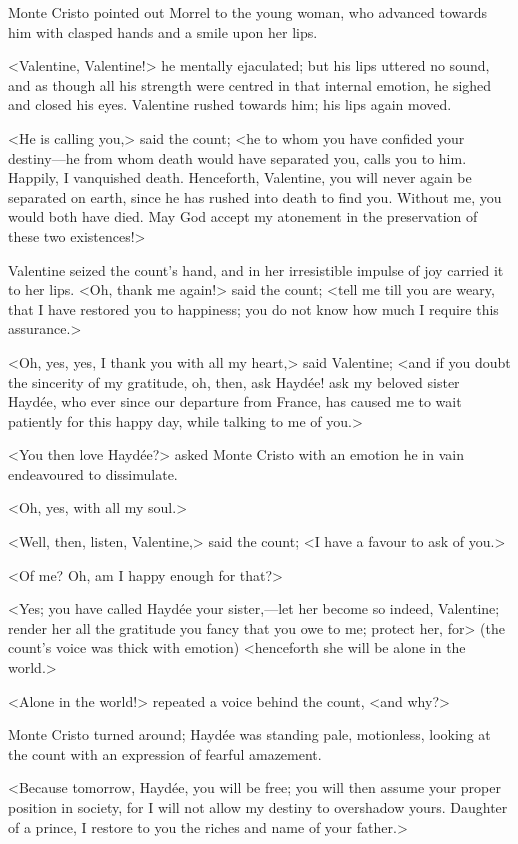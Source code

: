  Monte Cristo pointed out Morrel to the young woman, who advanced towards him with clasped hands and a smile upon her lips. 

 <Valentine, Valentine!> he mentally ejaculated; but his lips uttered no sound, and as though all his strength were centred in that internal emotion, he sighed and closed his eyes. Valentine rushed towards him; his lips again moved. 

 <He is calling you,> said the count; <he to whom you have confided your destiny—he from whom death would have separated you, calls you to him. Happily, I vanquished death. Henceforth, Valentine, you will never again be separated on earth, since he has rushed into death to find you. Without me, you would both have died. May God accept my atonement in the preservation of these two existences!> 

 Valentine seized the count's hand, and in her irresistible impulse of joy carried it to her lips.  <Oh, thank me again!> said the count; <tell me till you are weary, that I have restored you to happiness; you do not know how much I require this assurance.> 

 <Oh, yes, yes, I thank you with all my heart,> said Valentine; <and if you doubt the sincerity of my gratitude, oh, then, ask Haydée! ask my beloved sister Haydée, who ever since our departure from France, has caused me to wait patiently for this happy day, while talking to me of you.> 

 <You then love Haydée?> asked Monte Cristo with an emotion he in vain endeavoured to dissimulate. 

 <Oh, yes, with all my soul.> 

 <Well, then, listen, Valentine,> said the count; <I have a favour to ask of you.> 

 <Of me? Oh, am I happy enough for that?> 

 <Yes; you have called Haydée your sister,—let her become so indeed, Valentine; render her all the gratitude you fancy that you owe to me; protect her, for> (the count's voice was thick with emotion) <henceforth she will be alone in the world.> 

 <Alone in the world!> repeated a voice behind the count, <and why?> 

 Monte Cristo turned around; Haydée was standing pale, motionless, looking at the count with an expression of fearful amazement. 

 <Because tomorrow, Haydée, you will be free; you will then assume your proper position in society, for I will not allow my destiny to overshadow yours. Daughter of a prince, I restore to you the riches and name of your father.> 

